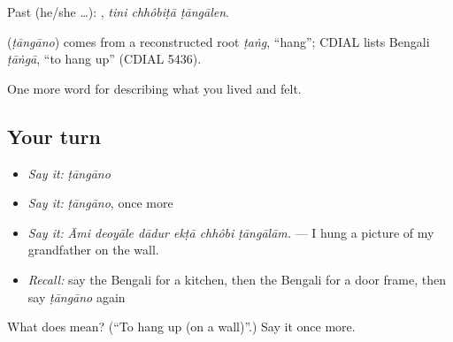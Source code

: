 Past (he/she …):   , \emph{tini chhôbiṭā ṭāngālen}.

\begin{cousinweb}
\textbf{} (\emph{ṭāngāno}) comes from a reconstructed root \emph{ṭaṅg}, \textquotedblleft{}hang\textquotedblright{}; CDIAL lists Bengali \emph{ṭāṅgā}, \textquotedblleft{}to hang up\textquotedblright{} (CDIAL 5436).
\end{cousinweb}

\begin{grammarlens}[title={What you've built}]
One more word for describing what you lived and felt.
\end{grammarlens}

\subsection*{Your turn}
\begin{itemize}
\raggedright
  \item \emph{Say it:} \emph{ṭāngāno}
  \item \emph{Say it:} \emph{ṭāngāno}, once more
  \item \emph{Say it:} \emph{Āmi deoyāle dādur ekṭā chhôbi ṭāngālām.} — I hung a picture of my grandfather on the wall.
  \item \emph{Recall:} say the Bengali for a kitchen, then the Bengali for a door frame, then say \emph{ṭāngāno} again
\end{itemize}

\begin{tcolorbox}[breakable,colback=teal!4,colframe=teal!35!black,title={Before you move on}]
What does  mean? (\textquotedblleft{}To hang up (on a wall)\textquotedblright{}.) Say it once more.
\end{tcolorbox}

